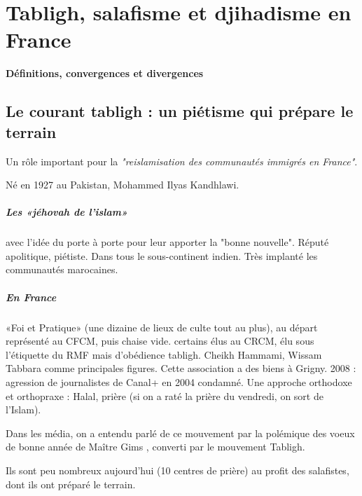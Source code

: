 
\chapter{Tabligh, salafisme et djihadisme en France }
\textbf{Définitions, convergences et
divergences}



\section{ Le courant tabligh : un piétisme qui prépare le terrain}
\label{sec:Tabligh}
Un rôle important pour la \emph{"reislamisation des communautés immigrés en France"}.

Né en 1927 au Pakistan, Mohammed Ilyas Kandhlawi. \paragraph{Les «jéhovah de l’islam» } avec l'idée du porte à porte pour leur apporter la "bonne nouvelle". Réputé apolitique, piétiste. Dans tous le sous-continent indien. Très implanté les communautés marocaines. 
\paragraph{En France}  «Foi et Pratique» (une dizaine de lieux de culte tout au plus), au départ représenté au CFCM, puis chaise vide. certains élus au CRCM, élu sous l'étiquette du RMF mais d'obédience tabligh. Cheikh Hammami, Wissam Tabbara comme principales figures.
Cette association a des biens à Grigny.
2008 : agression de journalistes de Canal+ en 2004 condamné.
Une approche orthodoxe et orthopraxe : Halal, prière (si on a raté la prière du vendredi, on sort de l'Islam). 


Dans les média, on a entendu parlé de ce mouvement par la polémique des voeux de bonne année de Maître Gims , converti par le mouvement Tabligh. 

\begin{Synthesis}
Ils sont peu nombreux aujourd'hui (10 centres de prière) au profit des salafistes, dont ils ont préparé le terrain.
\end{Synthesis}


